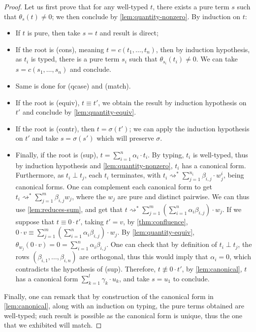 \documentclass[10pt,a4paper]{article}
\newcommand{\reduces}{\rightsquigarrow}
\newcommand{\sreduces}{\reduces^*}
\newcommand{\qt}[2]{\theta_{#1}(#2)}
\begin{document}
\begin{proof}
  Let us first prove that for any well-typed $t$, there exists a pure
  term $s$ such that $\qt st \neq 0$;
  we then conclude by \autoref{lem:quantity-nonzero}.
  By induction on $t$:

  \begin{itemize}

    \item If $t$ is pure, then take $s = t$ and result is direct;

    \item If the root is (cons), meaning $t = c(t_1, \dots, t_n)$,
      then by induction hypothesis,
      as $t_i$ is typed, there is a pure term $s_i$ such that $\qt
      {s_i} {t_i} \neq 0$.
      We can take $s = c(s_1, \dots, s_n)$ and conclude.

    \item Same is done for (qcase) and (match).

    \item If the root is (equiv), $t \equiv t'$, we obtain the result
      by induction hypothesis on $t'$ and conclude by
      \autoref{lem:quantity-equiv}.

    \item If the root is (contr), then $t = \sigma(t')$; we can apply
      the induction hypothesis on $t'$ and take $s = \sigma(s')$
      which will preserve $\sigma$.

    \item Finally, if the root is (sup), $t = \sum_{i=1}^n \alpha_i \cdot t_i$.
      By typing, $t_i$ is well-typed, thus by induction hypothesis and
      \autoref{lem:quantity-nonzero}, $t_i$ has a canonical form.
      Furthermore, as $t_i \perp t_j$, each $t_i$ terminates,
      with $t_i \sreduces \sum_{j=1}^{n_i} \beta_{i,j} \cdot w_j^i$,
      being canonical forms. One can complement each canonical
      form to get $t_i \sreduces \sum_{j=1}^m \beta_{i,j} w_j$,
      where the $w_j$ are pure and distinct pairwise.
      We can thus use \autoref{lem:reduces-sum}, and get that
      $t \sreduces \sum_{j=1}^m (\sum_{i=1}^n \alpha_i \beta_{i,j}) \cdot w_j$.
      If we suppose that $t \equiv 0 \cdot t'$, taking $t' = v$,
      by \autoref{thm:confluence}, $0 \cdot v \equiv \sum_{j=1}^m
      (\sum_{i=1}^n \alpha_i \beta_{i,j}) \cdot w_j$.
      By \autoref{lem:quantity-equiv}, $\qt {w_j}{0 \cdot v} = 0 =
      \sum_{i=1}^n \alpha_i \beta_{i,j}$.
      One can check that by definition of $t_i \perp t_j$, the rows
      $(\beta_{i,1}, \dots, \beta_{i,n})$
      are orthogonal, thus this would imply that $\alpha_i = 0$,
      which contradicts
      the hypothesis of (sup). Therefore, $t \not\equiv 0 \cdot t'$,
      by \autoref{lem:canonical}, $t$ has a canonical form
      $\sum_{k=1}^l \gamma_k \cdot u_k$,
      and take $s = u_1$ to conclude.
  \end{itemize}

  Finally, one can remark that by construction of the canonical form in
  \autoref{lem:canonical}, along with an induction on typing, the pure
  terms obtained are well-typed; such result is possible as the canonical
  form is unique, thus the one that we exhibited will match.
\end{proof}
\end{document}
